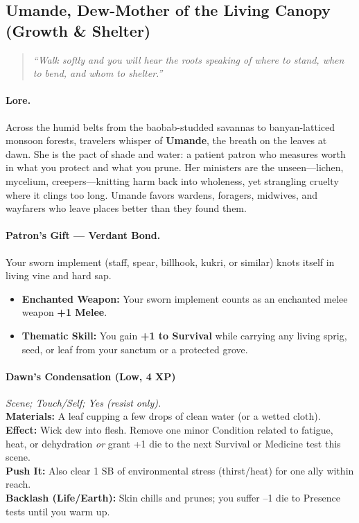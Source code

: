 \subsection{Umande, Dew-Mother of the Living Canopy (Growth \& Shelter)}
\begin{quote}\itshape
“Walk softly and you will hear the roots speaking of where to stand, when to bend, and whom to shelter.”
\end{quote}

\paragraph{Lore.}
Across the humid belts from the baobab-studded savannas to banyan-latticed monsoon forests, travelers whisper of \textbf{Umande}, the breath on the leaves at dawn. She is the pact of shade and water: a patient patron who measures worth in what you protect and what you prune. Her ministers are the unseen—lichen, mycelium, creepers—knitting harm back into wholeness, yet strangling cruelty where it clings too long. Umande favors wardens, foragers, midwives, and wayfarers who leave places better than they found them.

\paragraph{Patron’s Gift — Verdant Bond.}
Your sworn implement (staff, spear, billhook, kukri, or similar) knots itself in living vine and hard sap.
\begin{itemize}
  \item \textbf{Enchanted Weapon:} Your sworn implement counts as an enchanted melee weapon \textbf{+1 Melee}.
  \item \textbf{Thematic Skill:} You gain \textbf{+1 to Survival} while carrying any living sprig, seed, or leaf from your sanctum or a protected grove.
\end{itemize}


\paragraph{Dawn’s Condensation (Low, 4 XP)} \emph{Scene; Touch/Self; Yes (resist only).}\\
\textbf{Materials:} A leaf cupping a few drops of clean water (or a wetted cloth).\\
\textbf{Effect:} Wick dew into flesh. Remove one minor Condition related to fatigue, heat, or dehydration \emph{or} grant +1 die to the next Survival or Medicine test this scene.\\
\textbf{Push It:} Also clear 1 SB of environmental stress (thirst/heat) for one ally within reach.\\
\textbf{Backlash (Life/Earth):} Skin chills and prunes; you suffer --1 die to Presence tests until you warm up.

